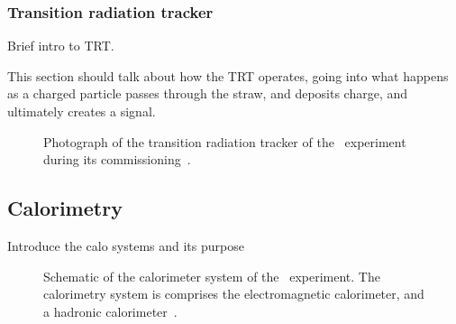 \FloatBarrier
\subsubsection{Transition radiation tracker} 

{\color{red} Brief intro to TRT. }

{\color{red}This section should talk about how the TRT operates, going into
  what happens as a charged particle passes through the straw, and deposits
  charge, and ultimately creates a signal.
}


\begin{figure}[ht]
  \caption{
    Photograph of the transition radiation tracker of the
    \atlas\ experiment during its commissioning~\cite{Maximilien:889555}.
  }
  \label{fig:trt_module}
\end{figure}

\FloatBarrier
\subsection{Calorimetry} 

{\color{red} Introduce the calo systems and its purpose}

\begin{figure}[ht]
  \caption[
    Schematic of the calorimeter system of the
    \atlas\ experiment~\cite{cern-jinst-atlas}.
  ]{
    Schematic of the calorimeter system of the
    \atlas\ experiment.
    The calorimetry system is comprises the electromagnetic calorimeter,
    and a hadronic calorimeter~\cite{cern-jinst-atlas}.
  }
  \label{fig:calo_cartoon}
\end{figure}


